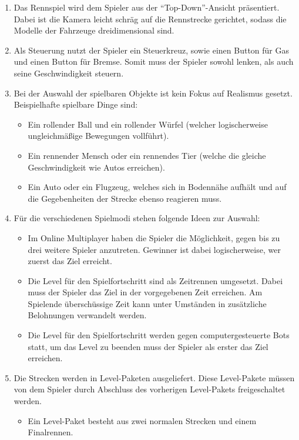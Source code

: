 	\begin{enumerate}
		\item{Das Rennspiel wird dem Spieler aus der \enquote{Top-Down}-Ansicht präsentiert. Dabei ist die Kamera leicht schräg auf die Rennstrecke gerichtet, sodass die Modelle der Fahrzeuge dreidimensional sind.}
		\item{Als Steuerung nutzt der Spieler ein Steuerkreuz, sowie einen Button für Gas und einen Button für Bremse. Somit muss der Spieler sowohl lenken, als auch seine Geschwindigkeit steuern.}
		\item{Bei der Auswahl der spielbaren Objekte ist kein Fokus auf Realismus gesetzt. Beispielhafte spielbare Dinge sind:}
		\begin{itemize}
			\item{Ein rollender Ball und ein rollender Würfel (welcher logischerweise ungleichmäßige Bewegungen vollführt).}
			\item{Ein rennender Mensch oder ein rennendes Tier (welche die gleiche Geschwindigkeit wie Autos erreichen).}
			\item{Ein Auto oder ein Flugzeug, welches sich in Bodennähe aufhält und auf die Gegebenheiten der Strecke ebenso reagieren muss.}
		\end{itemize}
		\item{Für die verschiedenen Spielmodi stehen folgende Ideen zur Auswahl:}
		\begin{itemize}
			\item{Im Online Multiplayer haben die Spieler die Möglichkeit, gegen bis zu drei weitere Spieler anzutreten. Gewinner ist dabei logischerweise, wer zuerst das Ziel erreicht.}
			\item{Die Level für den Spielfortschritt sind als Zeitrennen umgesetzt. Dabei muss der Spieler das Ziel in der vorgegebenen Zeit erreichen. Am Spielende überschüssige Zeit kann unter Umständen in zusätzliche Belohnungen verwandelt werden.}
			\item{Die Level für den Spielfortschritt werden gegen computergesteuerte Bots statt, um das Level zu beenden muss der Spieler als erster das Ziel erreichen.}
		\end{itemize}
		\item{Die Strecken werden in Level-Paketen ausgeliefert. Diese Level-Pakete müssen von dem Spieler durch Abschluss des vorherigen Level-Pakets freigeschaltet werden.}
		\begin{itemize}
			\item{Ein Level-Paket besteht aus zwei normalen Strecken und einem Finalrennen.}

\end{itemize}
\end{enumerate}
